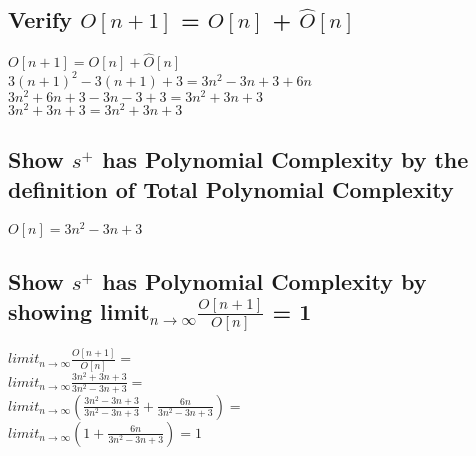 \documentclass[11pt]{article}
\begin{document}
\subsection{Verify $O[n+1]$ = $O[n]$ + $\hat{O}[n]$}
\begin{center}
$
O[n+1] = O[n] + \hat{O}[n]
$
\\ \vspace{2mm}
$
3(n+1)^2 -3(n+1) + 3 =  3n^2 -3n + 3 + 6n
$
\\ \vspace{2mm}
$
3n^2 + 6n + 3 - 3n -3 + 3 = 3n^2 + 3n + 3
$
\\ \vspace{2mm}
$
3n^2 + 3n+ 3 = 3n^2 + 3n + 3
$
\end{center}







\subsection{Show $s^+$ has Polynomial Complexity by the definition of Total Polynomial Complexity}
\begin{center}
\vspace{2mm}
$
O[n] = 3n^2 -3n + 3
$
\end{center}

\subsection{Show $s^+$ has Polynomial Complexity by showing limit$_{n \rightarrow \infty}\frac{O[n+1]}{O[n]}$ = 1}
\begin{center}
$
limit_{n \rightarrow \infty}\frac{O[n+1]}{O[n]} =
$
\\ \vspace{2mm}
$
limit_{n \rightarrow \infty}\frac{3n^2 + 3n + 3}{3n^2 - 3n + 3} =
$
\\ \vspace{2mm}
$
limit_{n \rightarrow \infty}(\frac{3n^2 - 3n + 3}{3n^2 - 3n + 3} + \frac{6n}{3n^2 - 3n + 3}) =
$
\\ \vspace{2mm}
$
limit_{n \rightarrow \infty}(1 + \frac{6n }{3n^2 - 3n + 3}) = 1
$
\end{center}
\end{document}
